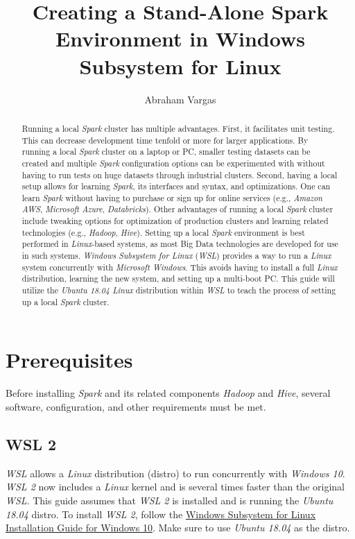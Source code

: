 \documentclass{article}
\begin{document}
\title{Creating a Stand-Alone Spark Environment in Windows Subsystem for Linux}
\author{Abraham Vargas}
\maketitle

\begin{abstract}
Running a local \emph{Spark} cluster has multiple advantages. First, it facilitates unit testing.
This can decrease development time tenfold or more for larger applications. By running a
local \emph{Spark} cluster on a laptop or PC, smaller testing datasets can be created and multiple
\emph{Spark} configuration options can be experimented with without having to run tests on huge
datasets through industrial clusters. Second, having a local setup allows for learning
\emph{Spark}, its interfaces and syntax, and optimizations. One can learn \emph{Spark} without
having to purchase or sign up for online services (e.g., \emph{Amazon AWS}, \emph{Microsoft Azure},
\emph{Databricks}). Other advantages of running a local \emph{Spark} cluster include tweaking
options for optimization of production clusters and learning related technologies (e.g.,
\emph{Hadoop}, \emph{Hive}). Setting up a local \emph{Spark} environment is best performed in
\emph{Linux}-based systems, as most Big Data technologies are developed for use in such systems.
\emph{Windows Subsystem for Linux} (\emph{WSL}) provides a way to run a \emph{Linux} system
concurrently with \emph{Microsoft Windows}. This avoids having to install a full \emph{Linux}
distribution, learning the new system, and setting up a multi-boot PC. This guide will utilize
the \emph{Ubuntu 18.04 Linux} distribution within \emph{WSL} to teach the process of setting up a
local \emph{Spark} cluster.
\end{abstract}

\newpage
\tableofcontents
\newpage

\section{Prerequisites}
Before installing \emph{Spark} and its related components \emph{Hadoop} and \emph{Hive}, several
software, configuration, and other requirements must be met.

  \subsection{WSL 2}
  \emph{WSL} allows a \emph{Linux} distribution (distro) to run concurrently with \emph{Windows 10}.
  \emph{WSL 2} now includes a \emph{Linux} kernel and is several times faster than the original
  \emph{WSL}. This guide assumes that \emph{WSL 2} is installed and is running the
  \emph{Ubuntu 18.04} distro. To install \emph{WSL 2}, follow the
  \href{https://docs.microsoft.com/en-us/windows/wsl/install-win10}{Windows Subsystem
  for Linux Installation Guide for Windows 10}. Make sure to use \emph{Ubuntu 18.04} as the distro.
\end{document}

